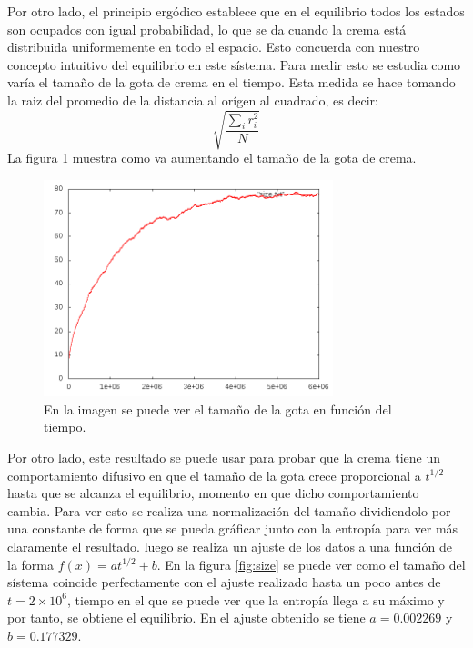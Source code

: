 \documentclass[12pt,twocolumn]{article}
\begin{document}
Por otro lado, el principio ergódico establece que en el equilibrio todos los estados son ocupados con igual probabilidad, lo que se da cuando la crema está distribuida uniformemente en todo el espacio. Esto concuerda con nuestro concepto intuitivo del equilibrio en este sístema. Para medir esto se estudia como varía el tamaño de la gota de crema en el tiempo. Esta medida se hace tomando la raiz del promedio de la distancia al orígen al cuadrado, es decir: 
\begin{equation*} \label{eq: root-mean}
	\sqrt{\frac{\sum_i r_i^2}{N}}
\end{equation*}
La figura \ref{fig:size_alone} muestra como va aumentando el tamaño de la gota de crema. 
\begin{figure}
    \centering
    \includegraphics[width=0.75\textwidth]{figs/size_alone.png}
    \caption{En la imagen se puede ver el tamaño de la gota en función del tiempo.}
    \label{fig:size_alone}
\end{figure}

Por otro lado, este resultado se puede usar para probar que la crema tiene un comportamiento difusivo en que el tamaño de la gota crece proporcional a $t^{1/2}$ hasta que se alcanza el equilibrio, momento en que dicho comportamiento cambia. Para ver esto se realiza una normalización del tamaño dividiendolo por una constante de forma que se pueda gráficar junto con la entropía para ver más claramente el resultado. luego se realiza un ajuste de los datos a una función de la forma $f(x)= at^{1/2} + b$. En la figura \ref{fig:size} se puede ver como el tamaño del sístema coincide perfectamente con el ajuste realizado hasta un poco antes de $t= 2\times 10^6$, tiempo en el que se puede ver que la entropía llega a su máximo y por tanto, se obtiene el equilibrio. En el ajuste obtenido se tiene $a=  0.002269$ y $b= 0.177329$.
\end{document}

